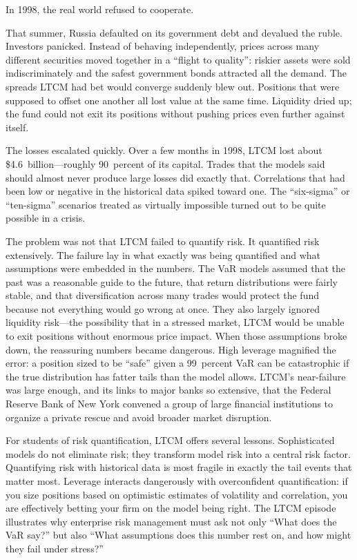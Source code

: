 \documentclass[11pt,openany]{book}
\begin{document}
\begin{corporateexample}
In 1998, the real world refused to cooperate.

That summer, Russia defaulted on its government debt and devalued the ruble.
Investors panicked. Instead of behaving independently, prices across many
different securities moved together in a ``flight to quality'': riskier assets
were sold indiscriminately and the safest government bonds attracted all the
demand. The spreads LTCM had bet would converge suddenly blew out. Positions
that were supposed to offset one another all lost value at the same time.
Liquidity dried up; the fund could not exit its positions without pushing
prices even further against itself.

The losses escalated quickly. Over a few months in 1998, LTCM lost about
\$4.6~billion---roughly 90~percent of its capital. Trades that the models said
should almost never produce large losses did exactly that. Correlations that
had been low or negative in the historical data spiked toward one. The
``six-sigma'' or ``ten-sigma'' scenarios treated as virtually impossible turned
out to be quite possible in a crisis.

The problem was not that LTCM failed to quantify risk. It quantified risk
extensively. The failure lay in what exactly was being quantified and what
assumptions were embedded in the numbers. The VaR models assumed that the past
was a reasonable guide to the future, that return distributions were fairly
stable, and that diversification across many trades would protect the fund
because not everything would go wrong at once. They also largely ignored
liquidity risk---the possibility that in a stressed market, LTCM would be
unable to exit positions without enormous price impact. When those assumptions
broke down, the reassuring numbers became dangerous. High leverage magnified
the error: a position sized to be ``safe'' given a 99~percent VaR can be
catastrophic if the true distribution has fatter tails than the model allows.
LTCM's near-failure was large enough, and its links to major banks so
extensive, that the Federal Reserve Bank of New York convened a group of large
financial institutions to organize a private rescue and avoid broader market
disruption.

For students of risk quantification, LTCM offers several lessons. Sophisticated
models do not eliminate risk; they transform model risk into a central risk
factor. Quantifying risk with historical data is most fragile in exactly the
tail events that matter most. Leverage interacts dangerously with overconfident
quantification: if you size positions based on optimistic estimates of
volatility and correlation, you are effectively betting your firm on the model
being right. The LTCM episode illustrates why enterprise risk management must
ask not only ``What does the VaR say?'' but also ``What assumptions does this
number rest on, and how might they fail under stress?''


\end{corporateexample}
\end{document}

